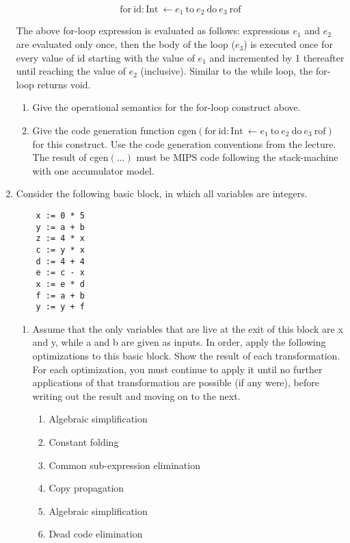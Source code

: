 \documentclass[11pt]{article}
\begin{document}
\begin{enumerate}
  $$\mbox{for}\ \mbox{id}: \mbox{Int}\ \leftarrow e_1\ \mbox{to}\ e_2\ \mbox{do}\ e_3\ \mbox{rof}$$ 
  
  The above for-loop expression is evaluated as follows: expressions $e_1$ and $e_2$ are evaluated only once, then the body of the loop ($e_3$) is executed once for every value of $\mbox{id}$ starting with the value of $e_1$ and incremented by 1 thereafter until reaching the value of $e_2$ (inclusive). Similar to the while loop, the for-loop returns void.
  
   \begin{enumerate}
    \item  Give the operational semantics for the for-loop construct above.
    \item  Give the code generation function $\mbox{cgen}(\mbox{for}\ \mbox{id}: \mbox{Int}\ \leftarrow e_1\ \mbox{to}\ e_2\ \mbox{do}\ e_3\ \mbox{rof})$ for this construct. Use the code generation conventions from the lecture. The result of $\mbox{cgen}(...)$ must be MIPS code following the stack-machine with one accumulator model.
  \end{enumerate}
  
 
  
  \item  Consider the following basic block, in which all variables are integers.
  
  \begin{lstlisting}
    x := 0 * 5
    y := a + b
    z := 4 * x
    c := y * x
    d := 4 + 4
    e := c - x
    x := e * d
    f := a + b
    y := y + f
  \end{lstlisting}
  \begin{enumerate}

  \item Assume that the only variables that are live at the exit of this block are x and y, while a and b are given as inputs. In order, apply the following optimizations to this basic block. Show the result of each transformation. For each optimization, you must continue to apply it until no further applications of that transformation are possible (if any were), before writing out the result and moving on to the next.
  
  \begin{enumerate}
    \item Algebraic simplification
    \item Constant folding
    \item Common sub-expression elimination
    \item Copy propagation
    \item Algebraic simplification
    \item Dead code elimination
  \end{enumerate}
  

\end{enumerate}
\end{enumerate}
\end{document}
